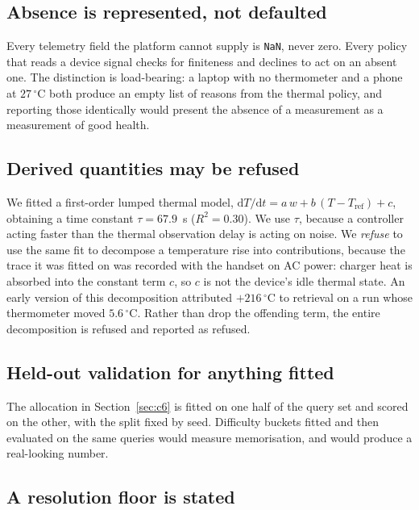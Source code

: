\documentclass[conference]{IEEEtran}
\begin{document}
\subsection{Absence is represented, not defaulted}

Every telemetry field the platform cannot supply is \texttt{NaN}, never zero.
Every policy that reads a device signal checks for finiteness and declines to
act on an absent one. The distinction is load-bearing: a laptop with no
thermometer and a phone at $27\,^{\circ}$C both produce an empty list of
reasons from the thermal policy, and reporting those identically would present
the absence of a measurement as a measurement of good health.

\subsection{Derived quantities may be refused}

We fitted a first-order lumped thermal model,
$\mathrm{d}T/\mathrm{d}t = a\,w + b\,(T - T_{\mathrm{ref}}) + c$, obtaining a
time constant $\tau = 67.9$~s ($R^2 = 0.30$). We use $\tau$, because a
controller acting faster than the thermal observation delay is acting on noise.
We \emph{refuse} to use the same fit to decompose a temperature rise into
contributions, because the trace it was fitted on was recorded with the handset
on AC power: charger heat is absorbed into the constant term $c$, so $c$ is not
the device's idle thermal state. An early version of this decomposition
attributed $+216\,^{\circ}$C to retrieval on a run whose thermometer moved
$5.6\,^{\circ}$C. Rather than drop the offending term, the entire decomposition
is refused and reported as refused.

\subsection{Held-out validation for anything fitted}

The allocation in Section~\ref{sec:c6} is fitted on one half of the query set
and scored on the other, with the split fixed by seed. Difficulty buckets fitted
and then evaluated on the same queries would measure memorisation, and would
produce a real-looking number.

\subsection{A resolution floor is stated}
\end{document}
